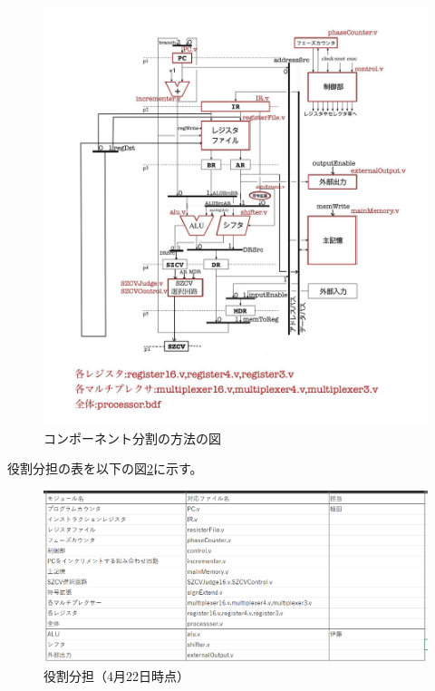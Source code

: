 \documentclass[a4j,titlepage]{jarticle}
\begin{document}
\begin{figure}[H]
    \begin{center}
    \includegraphics[scale = 0.22]{structure0506.jpg}
    \end{center}
    \caption{コンポーネント分割の方法の図}
    \label{moduleSplit0422}
\end{figure}

役割分担の表を以下の図\ref{rolesDivision0422}に示す。

\begin{figure}[H]
    \begin{center}
        \includegraphics[scale = 0.42]{rolesDivision0506.png}
    \end{center}
    \caption{役割分担（4月22日時点）}
    \label{rolesDivision0422}
\end{figure}
\end{document}
